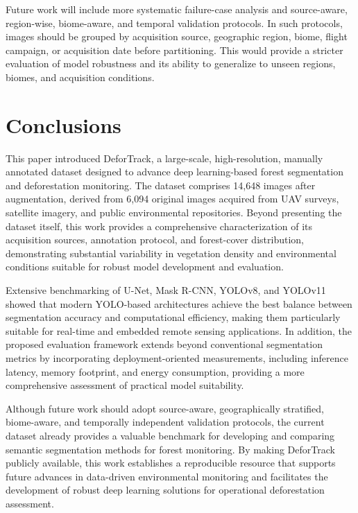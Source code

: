 \documentclass[journal,article,submit,pdftex,moreauthors]{Definitions/mdpi}
\begin{document}
Future work will include more systematic failure-case analysis and source-aware, region-wise, biome-aware, and temporal validation protocols. In such protocols, images should be grouped by acquisition source, geographic region, biome, flight campaign, or acquisition date before partitioning. This would provide a stricter evaluation of model robustness and its ability to generalize to unseen regions,
biomes, and acquisition conditions.


\section{Conclusions}\label{sec:conclusions}

This paper introduced DeforTrack, a large-scale, high-resolution, manually annotated dataset designed to advance deep learning-based forest segmentation and deforestation monitoring. The dataset comprises 14,648 images after augmentation, derived from 6,094 original images acquired from UAV surveys, satellite imagery, and public environmental repositories. Beyond presenting the dataset itself, this work provides a comprehensive characterization of its acquisition sources, annotation protocol, and forest-cover distribution, demonstrating substantial variability in vegetation density and environmental conditions suitable for robust model development and evaluation.

Extensive benchmarking of U-Net, Mask R-CNN, YOLOv8, and YOLOv11 showed that modern YOLO-based architectures achieve the best balance between segmentation accuracy and computational efficiency, making them particularly suitable for real-time and embedded remote sensing applications. In addition, the proposed evaluation framework extends beyond conventional segmentation metrics by incorporating deployment-oriented measurements, including inference latency, memory footprint, and energy consumption, providing a more comprehensive assessment of practical model suitability.


Although future work should adopt source-aware, geographically stratified, biome-aware, and temporally independent validation protocols, the current dataset already provides a valuable benchmark for developing and comparing semantic segmentation methods for forest monitoring. By making DeforTrack publicly available, this work establishes a reproducible resource that supports future advances in data-driven environmental monitoring and facilitates the development of robust deep learning solutions for operational deforestation assessment.
\end{document}
